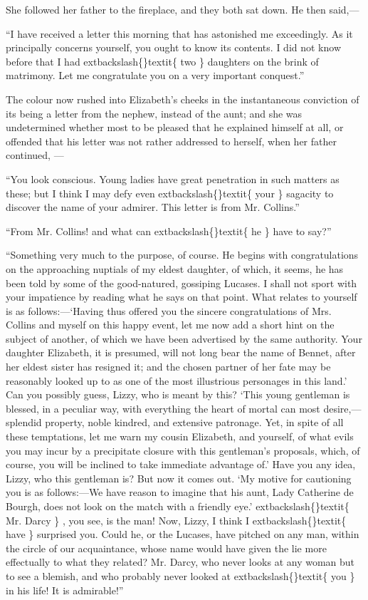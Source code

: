 \documentclass[10pt]{book}
\begin{document}
   She followed her father to the fireplace, and they both sat down. He
then said,—
  

   “I have received a letter this morning that has astonished me
exceedingly. As it principally concerns yourself, you ought to know its
contents. I did not know before that I had
   	extbackslash\{\}textit\{
    two
   \}
   daughters on the brink
of matrimony. Let me congratulate you on a very important conquest.”
  

   The colour now rushed into Elizabeth’s cheeks in the instantaneous
conviction of its being a letter from the nephew, instead of the aunt;
and she was undetermined whether most to be pleased that he explained
himself at all, or offended that his letter was not rather addressed to
herself, when her father continued,
   —
  

   “You look conscious. Young ladies have great penetration in such matters
as these; but I think I may defy even
   	extbackslash\{\}textit\{
    your
   \}
   sagacity to discover the
name of your admirer. This letter is from Mr. Collins.”
  

   “From Mr. Collins! and what can
   	extbackslash\{\}textit\{
    he
   \}
   have to say?”
  

   “Something very much to the purpose, of course. He begins with
congratulations on the approaching nuptials of my eldest daughter, of
which, it seems, he has been told by some of the good-natured, gossiping
Lucases. I shall not sport with your impatience by reading what he says
on that point. What relates to yourself is as follows:—‘Having thus
offered you the sincere congratulations of Mrs. Collins and myself on
this happy event, let me now add a short hint on the subject of another,
of which we have been advertised by the same authority. Your daughter
Elizabeth, it is presumed, will not long bear the name of Bennet, after
her eldest sister has resigned it; and the chosen partner of her fate
may be reasonably looked up to as one of the most illustrious personages
in this land.’ Can you possibly guess, Lizzy, who is meant by this?
‘This young gentleman is blessed, in a peculiar way, with everything the
heart of mortal can most desire,—splendid property, noble kindred, and
extensive patronage. Yet, in spite of all these temptations, let me warn
my cousin Elizabeth, and yourself, of what evils you may incur by a
precipitate closure with this gentleman’s proposals, which, of course,
you will be inclined to take immediate advantage of.’ Have you any idea,
Lizzy, who this gentleman is? But now it comes out. ‘My motive for
cautioning you is as follows:—We have reason to imagine that his aunt,
Lady Catherine de Bourgh, does not look on the match with a friendly
eye.’
   	extbackslash\{\}textit\{
    Mr. Darcy
   \}
   , you see, is the man! Now, Lizzy, I think
   I
   	extbackslash\{\}textit\{
    have
   \}
   surprised you. Could he, or the Lucases, have pitched on any man, within
the circle of our acquaintance, whose name would have given the lie more
effectually to what they related? Mr. Darcy, who never looks at any
woman but to see a blemish, and who probably never looked at
   	extbackslash\{\}textit\{
    you
   \}
   in
his life! It is admirable!”
  
\end{document}
